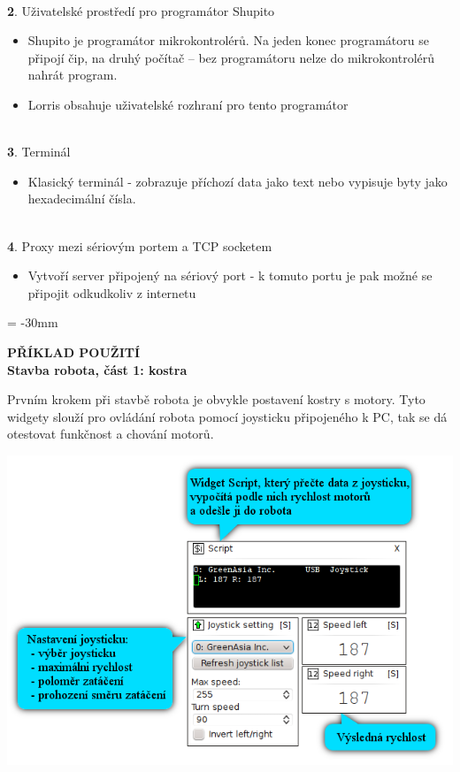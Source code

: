\documentclass[12pt, a4paper, oneside]{article}
\newcommand{\B}{\textbf} %
\begin{document}
\\{\large \B 2. Uživatelské prostředí pro programátor Shupito }

\begin{itemize}
    \item Shupito je programátor mikrokontrolérů. Na jeden konec programátoru se připojí čip, na druhý počítač -- bez programátoru nelze do mikrokontrolérů nahrát program.
    \item Lorris obsahuje uživatelské rozhraní pro tento programátor 
\end{itemize}

\\{\large \B 3. Terminál }

\begin{itemize}
    \item Klasický terminál - zobrazuje příchozí data jako text nebo vypisuje byty jako hexadecimální čísla.
\end{itemize}

\\{\large \B 4. Proxy mezi sériovým portem a TCP socketem }

\begin{itemize}
    \item Vytvoří server připojený na sériový port - k tomuto portu je pak možné se připojit odkudkoliv z internetu
\end{itemize}

\newpage
\voffset = -30mm %
\begin{center}
    \Large \B{PŘÍKLAD POUŽITÍ \\ Stavba robota, část 1: kostra}
\end{center}
\vspace{5mm}
Prvním krokem při stavbě robota je obvykle postavení kostry s motory. Tyto widgety slouží pro ovládání robota pomocí joysticku připojeného k PC, tak se dá otestovat funkčnost a chování motorů.
\vspace{30mm}
\begin{center}
\includegraphics{img/joystick2.png}
\end{center}
\end{document}
